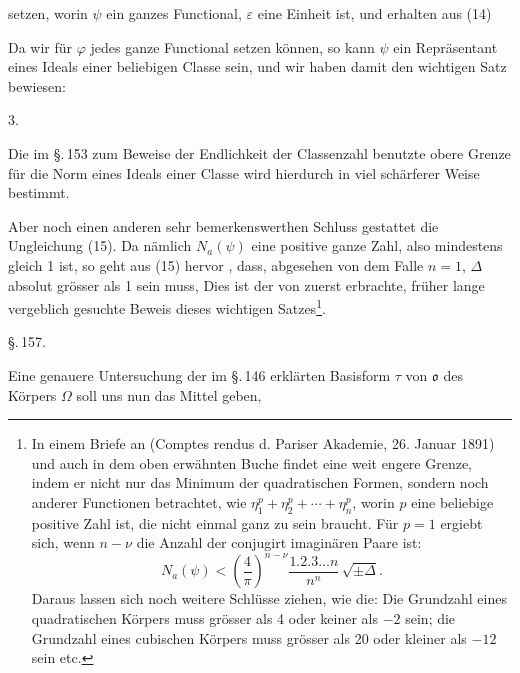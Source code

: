 setzen, worin $\psi$ ein ganzes Functional, $\varepsilon$ eine Einheit ist, und
erhalten aus (14)

Da wir f\"ur $\varphi$ jedes ganze Functional setzen k\"onnen, so kann
$\psi$ ein Repr\"asentant eines Ideals einer beliebigen Classe sein, und
wir haben damit den wichtigen Satz bewiesen:

3. 

Die im \S.\,153 zum Beweise der Endlichkeit der Classenzahl
benutzte obere Grenze f\"ur die Norm eines Ideals einer Classe
wird hierdurch in viel sch\"arferer Weise bestimmt.

Aber noch einen anderen sehr bemerkenswerthen Schluss
gestattet die Ungleichung (15). Da n\"amlich $N_a(\psi)$ eine positive
ganze Zahl, also mindestens gleich 1 ist, so geht aus (15) hervor
, dass, abgesehen von dem Falle $n=1$, $\Delta$ absolut gr\"osser als
1 sein muss,  Dies
ist der von  zuerst erbrachte, fr\"uher lange vergeblich
 gesuchte Beweis dieses wichtigen Satzes\footnote{In einem Briefe an  (Comptes rendus d. Pariser Akademie,
26. Januar 1891) und auch in dem oben erw\"ahnten Buche findet 
 eine weit engere Grenze, indem er nicht nur das Minimum
der quadratischen Formen, sondern noch anderer Functionen betrachtet,
wie $\eta_1^p + \eta_2^p + \cdots + \eta_n^p$, worin $p$ eine beliebige positive Zahl ist, die
nicht einmal ganz zu sein braucht. F\"ur $p=1$ ergiebt sich, wenn $n-\nu$
die Anzahl der conjugirt imagin\"aren Paare ist:
\[ N_a(\psi) < \left(\frac{4}{\pi}\right)^{n-\nu} \frac{1.2.3\ldots n}{n^n}\, \sqrt{\pm \Delta}. \]
Daraus lassen sich noch weitere Schl\"usse ziehen, wie die: Die Grundzahl
 eines quadratischen K\"orpers muss gr\"osser als 4 oder keiner als %
$-2$ sein; die Grundzahl eines cubischen K\"orpers muss gr\"osser als 20
oder kleiner als $-12$ sein etc.}.

\begin{center}
\S.\,157.

\end{center}

Eine genauere Untersuchung der im \S.\,146 erkl\"arten Basisform
 $\tau$ von $\mathfrak{o}$ des K\"orpers $\Omega$ soll uns nun das Mittel geben,
